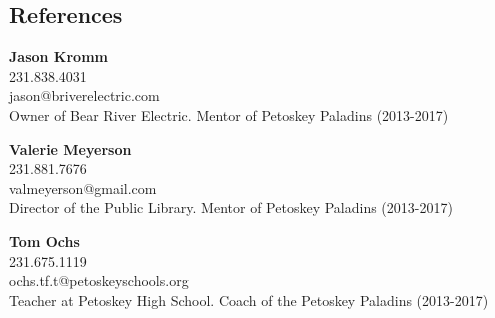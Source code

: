 \documentclass[line, margin, 10pt]{res}
\begin{document}
\renewcommand{\namefont}{ \LARGE \bf }

\address{begolf123@gmail.com}
\address{(989) 233-5663}

\begin{resume}
\section{References}

{\bf Jason Kromm} \\
231.838.4031\\
jason@briverelectric.com\\
Owner of Bear River Electric. Mentor of Petoskey Paladins (2013-2017)

{\bf Valerie Meyerson}\\
231.881.7676\\
valmeyerson@gmail.com\\
Director of the Public Library. Mentor of Petoskey Paladins (2013-2017)

{\bf Tom Ochs}\\
231.675.1119\\
ochs.tf.t@petoskeyschools.org\\
  Teacher at Petoskey High School. Coach of the Petoskey Paladins (2013-2017)

\end{resume}
\end{document}
